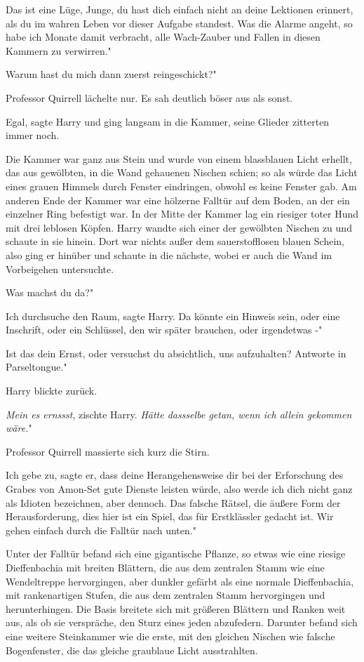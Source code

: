 \glqq{}Das ist eine Lüge, Junge, du hast dich einfach nicht an deine Lektionen
erinnert, als du im wahren Leben vor dieser Aufgabe standest. Was die Alarme
angeht, so habe ich Monate damit verbracht, alle Wach-Zauber und Fallen in
diesen Kammern zu verwirren."

\glqq{}Warum hast du mich dann zuerst reingeschickt?"

Professor Quirrell lächelte nur. Es sah deutlich böser aus als sonst.

\glqq{}Egal\grqq{}, sagte Harry und ging langsam in die Kammer, seine Glieder
zitterten immer noch.

Die Kammer war ganz aus Stein und wurde von einem blassblauen Licht erhellt, das
aus gewölbten, in die Wand gehauenen Nischen schien; so als würde das Licht
eines grauen Himmels durch Fenster eindringen, obwohl es keine Fenster gab. Am
anderen Ende der Kammer war eine hölzerne Falltür auf dem Boden, an der ein
einzelner Ring befestigt war. In der Mitte der Kammer lag ein riesiger toter
Hund mit drei leblosen Köpfen. Harry wandte sich einer der gewölbten Nischen zu
und schaute in sie hinein. Dort war nichts außer dem sauerstofflosen blauen
Schein, also ging er hinüber und schaute in die nächste, wobei er auch die Wand
im Vorbeigehen untersuchte.

\glqq{}Was machst du da?"

\glqq{}Ich durchsuche den Raum\grqq{}, sagte Harry. \glqq{}Da könnte ein Hinweis
sein, oder eine Inschrift, oder ein Schlüssel, den wir später brauchen, oder
irgendetwas -"

\glqq{}Ist das dein Ernst, oder versuchst du absichtlich, uns aufzuhalten?
Antworte in Parseltongue."

Harry blickte zurück.

\glqq{}\emph{Mein es ernssst}\grqq{}, zischte Harry. \glqq{}\emph{Hätte dassselbe
getan, wenn ich allein gekommen wäre.}"

Professor Quirrell massierte sich kurz die Stirn.

\glqq{}Ich gebe zu\grqq{}, sagte er, \glqq{}dass deine Herangehensweise dir bei
der Erforschung des Grabes von Amon-Set gute Dienste leisten würde, also werde
ich dich nicht ganz als Idioten bezeichnen, aber dennoch. Das falsche Rätsel,
die äußere Form der Herausforderung, dies hier ist ein Spiel, das für
Erstklässler gedacht ist. Wir gehen einfach durch die Falltür nach unten."

Unter der Falltür befand sich eine gigantische Pflanze, so etwas wie eine
riesige Dieffenbachia mit breiten Blättern, die aus dem zentralen Stamm wie eine
Wendeltreppe hervorgingen, aber dunkler gefärbt als eine normale Dieffenbachia,
mit rankenartigen Stufen, die aus dem zentralen Stamm hervorgingen und
herunterhingen. Die Basis breitete sich mit größeren Blättern und Ranken weit
aus, als ob sie verspräche, den Sturz eines jeden abzufedern. Darunter befand
sich eine weitere Steinkammer wie die erste, mit den gleichen Nischen wie
falsche Bogenfenster, die das gleiche graublaue Licht ausstrahlten.

